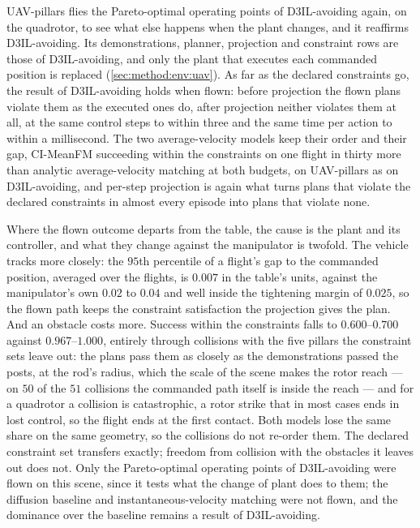 UAV-pillars flies the Pareto-optimal operating points of D3IL-avoiding again, on the quadrotor, to see what
else happens when the plant changes, and it reaffirms D3IL-avoiding. Its demonstrations, planner, projection
and constraint rows are those of D3IL-avoiding, and only the plant that executes each commanded position is
replaced (\autoref{sec:method:env:uav}). As far as the declared constraints go, the result of D3IL-avoiding holds when
flown: before projection the flown plans violate them as the executed ones do, after projection neither
violates them at all, at the same control steps to within three and the same time per action to within a
millisecond. The two average-velocity models keep their order and their gap, CI-MeanFM succeeding within the
constraints on one flight in thirty more than analytic average-velocity matching at both budgets, on
UAV-pillars as on D3IL-avoiding, and per-step projection is again what turns plans that violate the declared
constraints in almost every episode into plans that violate none.

Where the flown outcome departs from the table, the cause is the plant and its controller, and what they
change against the manipulator is twofold. The vehicle tracks more
closely: the $95$th percentile of a flight's gap to the commanded position, averaged over the flights, is
$0.007$ in the table's units, against the
manipulator's own $0.02$ to $0.04$ and well inside the tightening margin of $0.025$, so the flown path keeps
the constraint satisfaction the projection gives the plan. And an obstacle costs more. Success within the
constraints falls to $0.600$--$0.700$ against $0.967$--$1.000$, entirely through collisions with the five
pillars the constraint sets leave out: the plans pass them as closely as the demonstrations passed the posts,
at the rod's radius, which the scale of the scene makes the rotor reach --- on $50$ of the $51$ collisions the
commanded path itself is inside the reach --- and for a quadrotor a collision is catastrophic, a rotor strike
that in most cases ends in lost control, so the flight ends at the first contact. Both models lose the same
share on the same geometry, so the collisions do not re-order them. The declared constraint set transfers
exactly; freedom from collision with the obstacles it leaves out does not.
Only the Pareto-optimal operating points of D3IL-avoiding were flown on this scene, since it tests what
the change of plant does to them; the diffusion baseline and instantaneous-velocity matching were not flown,
and the dominance over the baseline remains a result of D3IL-avoiding.

